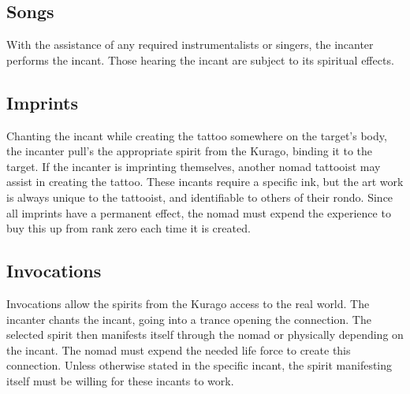 \begin{multicols*}{2}
\subsection{Songs}

With the assistance of any required instrumentalists or singers, the incanter performs the incant. Those hearing the incant are subject to its spiritual effects.

\subsection{Imprints}

Chanting the incant while creating the tattoo somewhere on the target's body, the incanter pull's the  appropriate spirit from the Kurago, binding it to the target. If the incanter is imprinting themselves, another nomad tattooist may assist in creating the tattoo. These incants require a specific ink, but the art work is always unique to the tattooist, and identifiable to others of their rondo. Since all imprints have a permanent effect, the nomad must expend the experience to buy this up from rank zero each time it is created.

\subsection{Invocations}

Invocations allow the spirits from the Kurago access to the real world. The incanter chants the incant, going into a trance opening the connection. The selected spirit then manifests itself through the nomad or physically depending on the incant. The nomad must expend the needed life force to create this connection. Unless otherwise stated in the specific incant, the spirit manifesting itself must be willing for these incants to work.



\end{multicols*}
